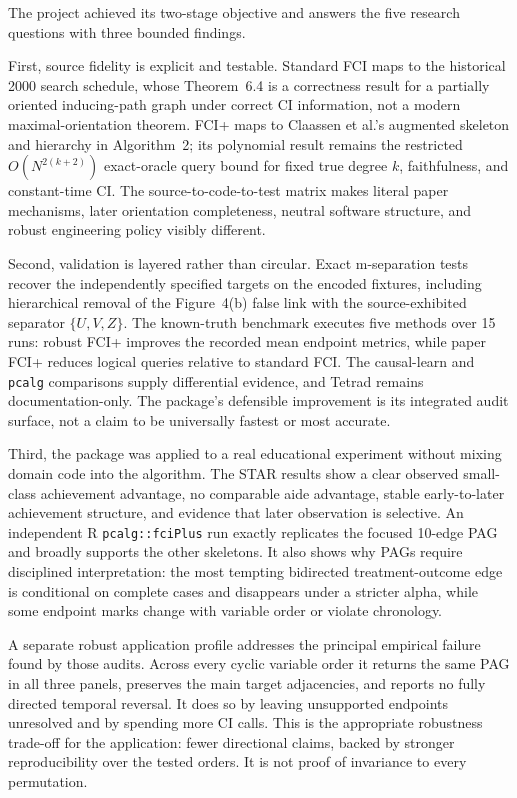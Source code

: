 \documentclass[11pt,a4paper,oneside]{report}
\newcommand{\code}[1]{\texttt{#1}}
\begin{document}
The project achieved its two-stage objective and answers the five research
questions with three bounded findings.

First, source fidelity is explicit and testable.  Standard FCI maps to the
historical 2000 search schedule, whose Theorem~6.4 is a correctness result for
a partially oriented inducing-path graph under correct CI information, not a
modern maximal-orientation theorem.  FCI+ maps to Claassen et al.'s augmented
skeleton and hierarchy in Algorithm~2; its polynomial result remains the
restricted \(O(N^{2(k+2)})\) exact-oracle query bound for fixed true degree
\(k\), faithfulness, and constant-time CI.  The source-to-code-to-test matrix
makes literal paper mechanisms, later orientation completeness, neutral
software structure, and robust engineering policy visibly different.

Second, validation is layered rather than circular. Exact m-separation tests
recover the independently specified targets on the encoded fixtures,
including hierarchical removal of the Figure~4(b) false link with the
source-exhibited separator \(\{U,V,Z\}\).  The known-truth benchmark executes
five methods over 15 runs: robust FCI+ improves the recorded mean endpoint
metrics, while paper FCI+ reduces logical queries relative to standard FCI.
The causal-learn and \code{pcalg} comparisons supply differential evidence,
and Tetrad remains documentation-only.  The package's defensible improvement
is its integrated audit surface, not a claim to be universally fastest or
most accurate.

Third, the package was applied to a real educational experiment without
mixing domain code into the algorithm. The STAR results show a clear observed
small-class achievement advantage, no comparable aide advantage, stable
early-to-later achievement structure, and evidence that later observation is
selective. An independent R \code{pcalg::fciPlus} run exactly replicates the
focused 10-edge PAG and broadly supports the other skeletons. It also shows
why PAGs require disciplined interpretation: the most tempting bidirected
treatment-outcome edge is conditional on complete cases and disappears under a
stricter alpha, while some endpoint marks change with variable order or violate
chronology.

A separate robust application profile addresses the principal empirical
failure found by those audits. Across every cyclic variable order it returns
the same PAG in all three panels, preserves the main target adjacencies, and
reports no fully directed temporal reversal. It does so by leaving unsupported
endpoints unresolved and by spending more CI calls. This is the appropriate
robustness trade-off for the application: fewer directional claims, backed by
stronger reproducibility over the tested orders. It is not proof of invariance
to every permutation.
\end{document}
